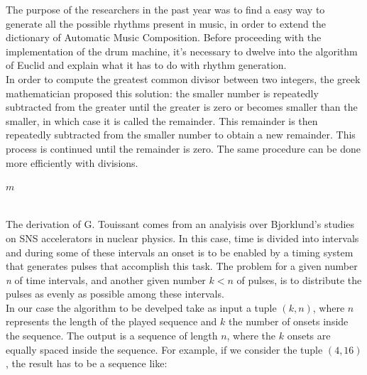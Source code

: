 \documentclass[main.tex]{subfiles}
\begin{document}
The purpose of the researchers in the past year was to find a easy way to generate all the possible rhythms present in music, in order to extend the dictionary of Automatic Music Composition\cite{Allouche:2002:AutomSeq:book}.
Before proceeding with the implementation of the drum machine, it’s necessary to dwelve into the algorithm of Euclid and explain what it has to do with rhythm generation.\\
In order to compute the greatest common divisor between two integers, the greek mathematician proposed this solution: the smaller number is repeatedly subtracted from the greater until the greater is zero or becomes smaller than the smaller, in which case it is called the remainder. This remainder is then repeatedly subtracted from the smaller number to obtain a new remainder. This process is continued until the remainder is zero\cite{Euclid:Elements}. 
The same procedure can be done more efficiently with divisions.\\
[2mm]
\begin{algorithm}
\label{euclid}
\begin{algorithmic}[1]
\State \Return $m$
\Else
\State {}

\EndIf
\EndProcedure
\end{algorithmic}
\end{algorithm}\\
[3mm]
The derivation of G. Touissant\cite{Toussaint:2004:euclidean:rhythm} comes from an analyisis over Bjorklund's studies on SNS accelerators\cite{Bjorklund:2003:euclidean:rhythm} in nuclear physics. In this case, time is divided into intervals and during some of these intervals an onset is to be enabled by a timing system that generates pulses that accomplish this task. The problem for a given number \textit{n} of time intervals, and another given number \begin{math}k<n\end{math} of pulses, is to distribute the pulses as evenly as possible among these intervals.\\
In our case the algorithm to be develped take as input a tuple \begin{math}{(k, n)}\end{math}, where \begin{math}{n}\end{math} represents the length of the played sequence and \begin{math}{k}\end{math} the number of onsets inside the sequence. The output is a sequence of length \begin{math}{n}\end{math}, where the \begin{math}{k}\end{math} onsets are equally spaced inside the sequence. For example, if we consider the tuple \begin{math}{(4, 16)}\end{math}, the result has to be a sequence like:\\
\end{document}
